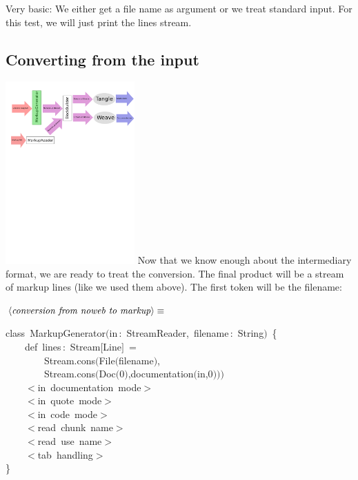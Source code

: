 \documentclass[a4paper,12pt]{article}
\begin{document}
Very basic: We either get a file name as argument or we treat standard input. For
this test, we will just print the lines stream.


\subsection{Converting from the input}

\includegraphics[viewport=0 500 264 800,clip,height=7cm]{images/markupGenerator.pdf}
Now that we know enough about the intermediary format, we are ready to
treat the conversion. The final product will be a stream of markup lines
(like we used them above). The first token will be the filename:

$\left<\mbox{\emph{conversion from noweb to markup}}\right>\equiv$
\begin{program}{\vem class}~MarkupGenerator$($in\,{\rm :}~StreamReader,~filename\,{\rm :}~String$)$~{\small\{}
\\~~~~{\vem def}~lines\,{\rm :}~Stream$[$Line$]$~=
\\~~~~~~~~Stream.cons$($File$($filename$)$,
\\~~~~~~~~Stream.cons$($Doc$($0$)$,documentation$($in,0$)$$)$$)$
\\~~~~$<$in~documentation~mode$>$
\\~~~~$<$in~quote~mode$>$
\\~~~~$<$in~code~mode$>$
\\[0.5em]~~~~$<$read~chunk~name$>$
\\~~~~$<$read~use~name$>$
\\[0.5em]~~~~$<$tab~handling$>$
\\{\small\}}
\\[0.5em]\end{program}
\end{document}
